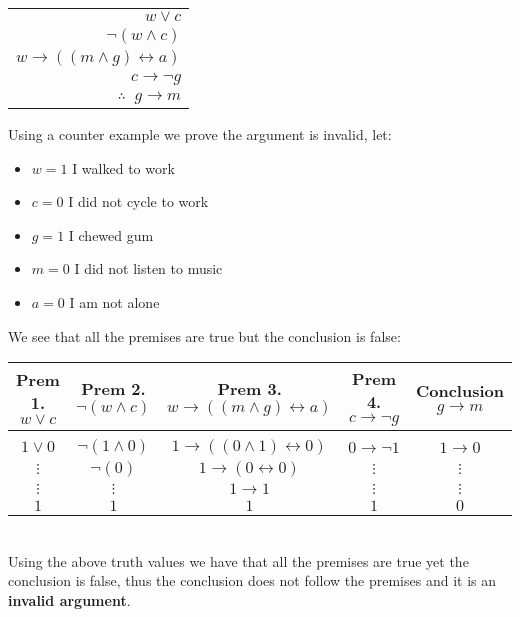 \documentclass{article}
\begin{document}
\begin{table}[htp]
    \centering
    \begin{tabular}{r}
        $w \lor c$\\
        $\lnot(w \land c)$\\
        $w\rightarrow ((m\land g) \leftrightarrow a)$\\
        $c \rightarrow \lnot g$\\
        \hline
        $\therefore \;\; g\rightarrow m$
    \end{tabular}
\end{table}
Using a counter example we prove the argument is invalid, let:
\begin{itemize}
    \item $w=1$ I walked to work
    \item $c=0$ I did not cycle to work
    \item $g=1$ I chewed gum
    \item $m=0$ I did not listen to music
    \item $a=0$ I am not alone
\end{itemize}
We see that all the premises are true but the conclusion is false:

\begin{table}[htp]
    \centering
    \begin{tabular}{c|c|c|c|c}
        Prem 1. $w \lor c$& Prem 2. $\lnot(w \land c)$& Prem 3. $w\rightarrow ((m\land g) \leftrightarrow a)$& Prem 4. $c \rightarrow \lnot g$& Conclusion $g\rightarrow m$\\\hline\\
        $1\lor 0$ & $\lnot(1\land0)$ & $1\rightarrow((0\land1)\leftrightarrow 0)$ & $0\rightarrow \lnot 1$ & $1\rightarrow 0$\\
        $\vdots$&$\lnot(0)$&$1\rightarrow(0 \leftrightarrow 0)$&$\vdots$& $\vdots$\\
        $\vdots$ & $\vdots$ & $1\rightarrow1$ & $\vdots$ & $\vdots$\\
        $1$ &$1$ &$1$ &$1$ & $0$
    \end{tabular}
\end{table}
 \\Using the above truth values we have that all the premises are true yet the conclusion is false, thus the conclusion does not follow the premises and it is an \textbf{invalid argument}.

\newpage
\end{document}
